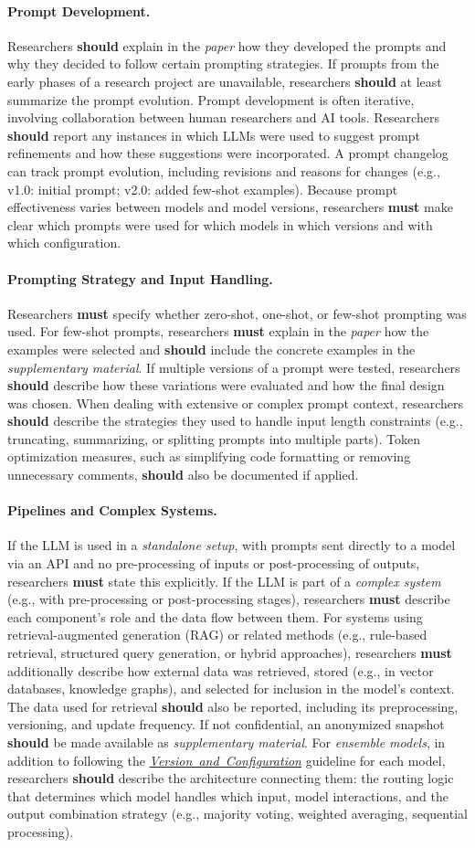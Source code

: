 \documentclass[smallextended]{svjour3}
\newcommand{\must}{\textbf{must}\xspace}
\newcommand{\should}{\textbf{should}\xspace}
\newcommand{\paper}{\emph{paper}\xspace}
\newcommand{\supplementarymaterial}{\emph{supplementary material}\xspace}
\newcommand{\paper}{\emph{paper}\xspace}
\newcommand{\supplementarymaterial}{\emph{supplementary material}\xspace}
\newcommand{\modelversion}{\hyperref[sec:report-model-version-configuration-and-customizations]{\mbox{\emph{Version and Configuration}}}\xspace}
\newcommand{\modelversion}{\href{/guidelines/model-version/}{\emph{Version and Configuration}}\xspace}
\newcommand{\guidelineparagraph}[1]{\paragraph{#1.}}
\newcommand{\guidelineparagraph}[1]{\paragraph{#1}}
\begin{document}
\guidelineparagraph{Prompt Development}
Researchers \should explain in the \paper how they developed the prompts and why they decided to follow certain prompting strategies.
If prompts from the early phases of a research project are unavailable, researchers \should at least summarize the prompt evolution.
Prompt development is often iterative, involving collaboration between human researchers and AI tools.
Researchers \should report any instances in which LLMs were used to suggest prompt refinements and how these suggestions were incorporated.
A prompt changelog can track prompt evolution, including revisions and reasons for changes (e.g., v1.0: initial prompt; v2.0: added few-shot examples).
Because prompt effectiveness varies between models and model versions, researchers \must make clear which prompts were used for which models in which versions and with which configuration.

\guidelineparagraph{Prompting Strategy and Input Handling}
Researchers \must specify whether zero-shot, one-shot, or few-shot prompting was used.
For few-shot prompts, researchers \must explain in the \paper how the examples were selected and \should include the concrete examples in the \supplementarymaterial.
If multiple versions of a prompt were tested, researchers \should describe how these variations were evaluated and how the final design was chosen.
When dealing with extensive or complex prompt context, researchers \should describe the strategies they used to handle input length constraints (e.g., truncating, summarizing, or splitting prompts into multiple parts).
Token optimization measures, such as simplifying code formatting or removing unnecessary comments, \should also be documented if applied.

\guidelineparagraph{Pipelines and Complex Systems}
If the LLM is used in a \emph{standalone setup}, with prompts sent directly to a model via an API and no pre-processing of inputs or post-processing of outputs, researchers \must state this explicitly.
If the LLM is part of a \emph{complex system} (e.g., with pre-processing or post-processing stages), researchers \must describe each component's role and the data flow between them.
For systems using retrieval-augmented generation (RAG) or related methods (e.g., rule-based retrieval, structured query generation, or hybrid approaches), researchers \must additionally describe how external data was retrieved, stored (e.g., in vector databases, knowledge graphs), and selected for inclusion in the model's context.
The data used for retrieval \should also be reported, including its preprocessing, versioning, and update frequency. If not confidential, an anonymized snapshot \should be made available as \supplementarymaterial.
For \emph{ensemble models}, in addition to following the \modelversion guideline for each model, researchers \should describe the architecture connecting them: the routing logic that determines which model handles which input, model interactions, and the output combination strategy (e.g., majority voting, weighted averaging, sequential processing).
\end{document}
